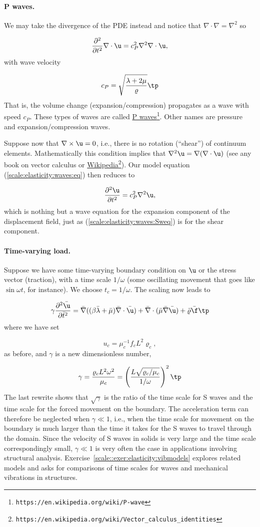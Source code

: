 \documentclass[graybox,envcountchap,sectrefs,final]{svmonodo}
\begin{document}
\paragraph{P waves.}
We may take the divergence of the PDE instead and notice that $\nabla\cdot\nabla
=\nabla^2$ so

\[\frac{\partial^2}{\partial t^2}\nabla\cdot\u = c_P^2\nabla^2\nabla\cdot\u,\]
with wave velocity

\[ c_P = \sqrt{\frac{\lambda +2\mu}{\varrho}}\tp\]
That is, the volume change (expansion/compression)
propagates as a wave with speed $c_P$.
These types of waves are called \href{{https://en.wikipedia.org/wiki/P-wave}}{P waves}\footnote{\texttt{https://en.wikipedia.org/wiki/P-wave}}. Other names are pressure and expansion/compression waves.

Suppose now that $\nabla\times\u =0$, i.e., there is no rotation (``shear'') of
continuum elements. Mathematically this condition implies that
$\nabla^2\u = \nabla(\nabla\cdot\u)$ (see any book on vector calculus
or \href{{https://en.wikipedia.org/wiki/Vector_calculus_identities}}{Wikipedia}\footnote{\texttt{https://en.wikipedia.org/wiki/Vector\_calculus\_identities}}).
Our model equation (\ref{scale:elasticity:waves:eq}) then reduces to

\[ \frac{\partial^2\u}{\partial t^2} = c_P^2\nabla^2\u,\]
\label{scale:elasticity:waves:Pweq}
which is nothing but a wave equation for the expansion component of the
displacement field, just as (\ref{scale:elasticity:waves:Sweq}) is for the
shear component.


\paragraph{Time-varying load.}
Suppose we have some time-varying boundary condition on $\u$ or the
stress vector (traction), with a time scale $1/\omega$ (some
oscillating movement that goes like $\sin\omega t$, for instance). We
choose $t_c=1/\omega$.  The scaling now leads to

\[
\gamma
\frac{\partial^2\bar \u}{\partial \bar t^2} =
\bar \nabla ((\beta\bar\lambda +
\bar\mu)\bar \nabla\cdot\bar \u) +
\bar \nabla\cdot(\bar \mu\bar \nabla\bar \u) +
\bar\varrho\bar\f\tp
\]
where we have set

\[ u_c = \mu_c^{-1}f_cL^2\varrho_c,\]
as before, and $\gamma$ is a new dimensionless number,

\[ \gamma = \frac{\varrho_cL^2 \omega^2}{\mu_c} =
\left(\frac{L\sqrt{\varrho_c/\mu_c}}{1/\omega}\right)^2\tp\]
The last rewrite shows that $\sqrt{\gamma}$ is the ratio of
the time scale for S waves and the time scale for the forced
movement on the boundary. The acceleration term can therefore
be neglected when $\gamma\ll 1$, i.e., when the time scale
for movement on the boundary is much larger than the time it
takes for the S waves to travel through the domain.
Since the velocity of S waves in solids is very large and
the time scale correspondingly small, $\gamma\ll 1$
is very often the case in applications involving structural analysis.
Exercise~\ref{scale::exer:elasticity:vibmodels} explores related
models and asks for comparisons of time scales for waves and
mechanical vibrations in structures.
\end{document}
